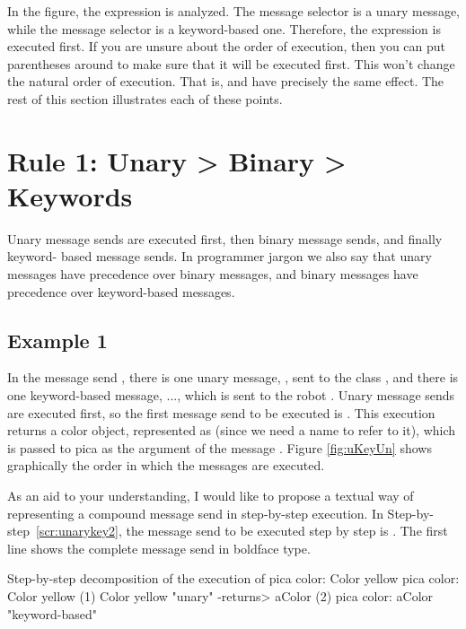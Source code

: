 \documentclass[a4paper,10pt,twoside]{book}
\begin{document}
In the figure, the expression  is analyzed. The message selector  is a unary message, while the message selector  is a keyword-based one. Therefore, the expression  is executed first. If you are unsure about the order of execution, then you can put
parentheses around  to make sure that it will be executed first. This won’t change 
the natural order of execution. That is,  and  have precisely the same effect. The rest of this section illustrates each of these points. 


\section{Rule 1: Unary > Binary > Keywords}

Unary message sends are executed first, then binary message sends, and finally keyword- 
based message sends. In programmer jargon we also say that unary messages have precedence 
over binary messages, and binary messages have precedence over keyword-based messages. 

\subsection{Example 1}
In the message send , there is one unary message, , sent 
to the class , and there is one keyword-based message,  ..., which is sent to the 
robot . Unary message sends are executed first, so the first message send to be executed 
is . This execution returns a color object, represented as  (since we need a 
name to refer to it), which is passed to pica as the argument of the message . 
Figure \ref{fig:uKeyUn} shows graphically the order in which the messages are executed. 

As an aid to your understanding, I would like to propose a textual way of representing a 
compound message send in step-by-step execution. In Step-by-step~\ref{scr:unarykey2}, the message send 
to be executed step by step is . The first line shows the complete 
message send in boldface type.

\begin{script}[unarykey2]{Step-by-step decomposition of the execution of pica color: Color yellow}
pica color: Color yellow 
(1)           Color yellow        "unary" 
-returns> aColor  
(2) pica color: aColor "keyword-based" 
\end{script}
\end{document}
